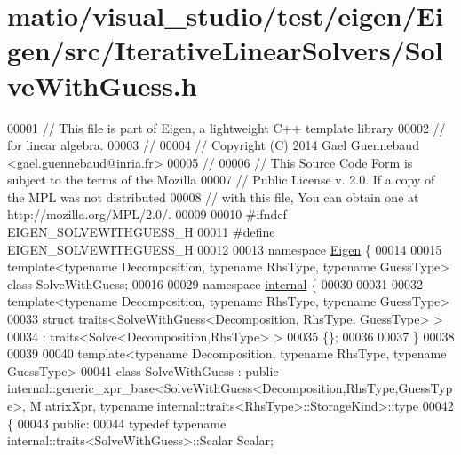 \hypertarget{matio_2visual__studio_2test_2eigen_2_eigen_2src_2_iterative_linear_solvers_2_solve_with_guess_8h_source}{}\section{matio/visual\+\_\+studio/test/eigen/\+Eigen/src/\+Iterative\+Linear\+Solvers/\+Solve\+With\+Guess.h}
\label{matio_2visual__studio_2test_2eigen_2_eigen_2src_2_iterative_linear_solvers_2_solve_with_guess_8h_source}

\begin{DoxyCode}
00001 \textcolor{comment}{// This file is part of Eigen, a lightweight C++ template library}
00002 \textcolor{comment}{// for linear algebra.}
00003 \textcolor{comment}{//}
00004 \textcolor{comment}{// Copyright (C) 2014 Gael Guennebaud <gael.guennebaud@inria.fr>}
00005 \textcolor{comment}{//}
00006 \textcolor{comment}{// This Source Code Form is subject to the terms of the Mozilla}
00007 \textcolor{comment}{// Public License v. 2.0. If a copy of the MPL was not distributed}
00008 \textcolor{comment}{// with this file, You can obtain one at http://mozilla.org/MPL/2.0/.}
00009 
00010 \textcolor{preprocessor}{#ifndef EIGEN\_SOLVEWITHGUESS\_H}
00011 \textcolor{preprocessor}{#define EIGEN\_SOLVEWITHGUESS\_H}
00012 
00013 \textcolor{keyword}{namespace }\hyperlink{namespace_eigen}{Eigen} \{
00014 
00015 \textcolor{keyword}{template}<\textcolor{keyword}{typename} Decomposition, \textcolor{keyword}{typename} RhsType, \textcolor{keyword}{typename} GuessType> \textcolor{keyword}{class }SolveWithGuess;
00016   
00029 \textcolor{keyword}{namespace }\hyperlink{namespaceinternal}{internal} \{
00030 
00031 
00032 \textcolor{keyword}{template}<\textcolor{keyword}{typename} Decomposition, \textcolor{keyword}{typename} RhsType, \textcolor{keyword}{typename} GuessType>
00033 \textcolor{keyword}{struct }traits<SolveWithGuess<Decomposition, RhsType, GuessType> >
00034   : traits<Solve<Decomposition,RhsType> >
00035 \{\};
00036 
00037 \}
00038 
00039 
00040 \textcolor{keyword}{template}<\textcolor{keyword}{typename} Decomposition, \textcolor{keyword}{typename} RhsType, \textcolor{keyword}{typename} GuessType>
00041 \textcolor{keyword}{class }SolveWithGuess : \textcolor{keyword}{public} internal::generic\_xpr\_base<SolveWithGuess<Decomposition,RhsType,GuessType>, M
      atrixXpr, typename internal::traits<RhsType>::StorageKind>::type
00042 \{
00043 \textcolor{keyword}{public}:
00044   \textcolor{keyword}{typedef} \textcolor{keyword}{typename} internal::traits<SolveWithGuess>::Scalar Scalar;

\end{DoxyCode}
